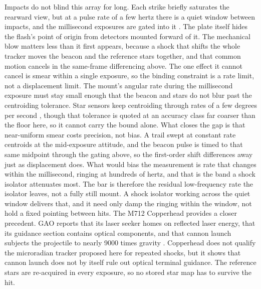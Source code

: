 \documentclass{article}
\begin{document}
Impacts do not blind this array for long. Each strike briefly saturates the rearward view, but at a pulse rate of a few hertz there is a quiet window between impacts, and the millisecond exposures are gated into it \cite{Katz_puffsat_control_sim_2026}. The plate itself hides the flash's point of origin from detectors mounted forward of it. The mechanical blow matters less than it first appears, because a shock that shifts the whole tracker moves the beacon and the reference stars together, and that common motion cancels in the same-frame differencing above. The one effect it cannot cancel is smear within a single exposure, so the binding constraint is a rate limit, not a displacement limit. The mount's angular rate during the millisecond exposure must stay small enough that the beacon and stars do not blur past the centroiding tolerance. Star sensors keep centroiding through rates of a few degrees per second \cite{zhang2012blurredstar}, though that tolerance is quoted at an accuracy class far coarser than the floor here, so it cannot carry the bound alone. What closes the gap is that near-uniform smear costs precision, not bias. A trail swept at constant rate centroids at the mid-exposure attitude, and the beacon pulse is timed to that same midpoint through the gating above, so the first-order shift differences away just as displacement does. What would bias the measurement is rate that changes within the millisecond, ringing at hundreds of hertz, and that is the band a shock isolator attenuates most. The bar is therefore the residual low-frequency rate the isolator leaves, not a fully still mount. A shock isolator working across the quiet window delivers that, and it need only damp the ringing within the window, not hold a fixed pointing between hits. The M712 Copperhead provides a closer precedent. GAO reports that its laser seeker homes on reflected laser energy, that its guidance section contains optical components, and that cannon launch subjects the projectile to nearly \num{9000} times gravity \cite{gao1985_copperhead}. Copperhead does not qualify the microradian tracker proposed here for repeated shocks, but it shows that cannon launch does not by itself rule out optical terminal guidance. The reference stars are re-acquired in every exposure, so no stored star map has to survive the hit.
\end{document}
